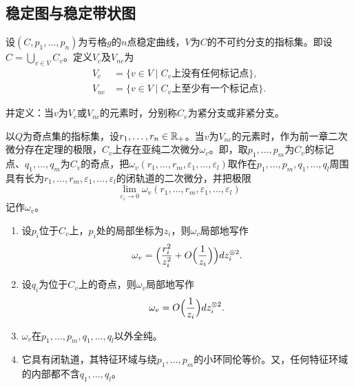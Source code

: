 
\subsection{稳定图与稳定带状图}

设$(C,p_1,\dots,p_n)$为亏格$g$的$n$点稳定曲线，$V$为$C$的不可约分支的指标集。即设\mbox{$C=\bigcup_{v\in V}C_v$}。定义$V_c$及$V_{nc}$为
\[
\begin{aligned}
V_c&=\{v\in V\mid C_v\text{上没有任何标记点}\},\\
V_{nc}&=\{v\in V\mid C_v\text{上至少有一个标记点}\}.
\end{aligned}
\]

并定义：当$v$为$V_c$或$V_{nc}$的元素时，分别称$C_v$为紧分支或非紧分支。

以$Q$为奇点集的指标集，设$r_1,\dots,r_n\in\mathbb{R}_+$。当$v$为$V_{nc}$的元素时，作为前一章二次微分存在定理的极限，$C_v$上存在亚纯二次微分$\omega_v$。即，取$p_1,\dots,p_m$为$C_v$的标记点、$q_1,\dots,q_m$为$C_v$的奇点，把$\omega_v(r_1,\dots,r_m,\varepsilon_1,\dots,\varepsilon_l)$取作在$p_1,\dots,p_m,q_1,\dots,q_l$周围具有长为$r_1,\dots,r_m,\varepsilon_1,\dots,\varepsilon_l$的闭轨道的二次微分，并把极限
\[
\lim_{\varepsilon_i\to0}\omega_v(r_1,\dots,r_m,\varepsilon_1,\dots,\varepsilon_l)
\]
记作$\omega_v$。


\begin{enumerate}[label=(\arabic*)]
\item 设$p_i$位于$C_v$上，$p_i$处的局部坐标为$z_i$，则$\omega_v$局部地写作
\[
\omega_v=\Bigl(\frac{r_i^2}{z_i^2}+O\Bigl(\frac{1}{z_i}\Bigr)\Bigr)dz_i^{\otimes2}.
\]
\item 设$q_i$为位于$C_v$上的奇点，则$\omega_v$局部地写作
\[
\omega_v=O\Bigl(\frac{1}{z_i}\Bigr)dz_i^{\otimes2}.
\]
\item $\omega_v$在$p_1,\dots,p_m,q_1,\dots,q_l$以外全纯。
\item 它具有闭轨道，其特征环域与绕$p_1,\dots,p_m$的小环同伦等价。又，任何特征环域的内部都不含$q_1,\dots,q_l$。
\end{enumerate}


